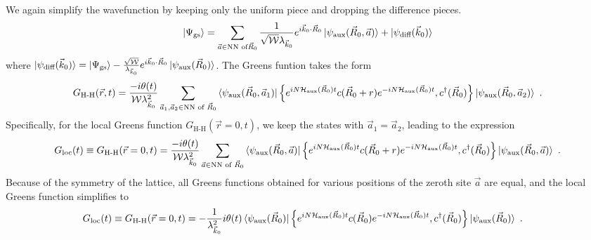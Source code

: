 \documentclass[prb]{revtex4-2}
\begin{document}
We again simplify the wavefunction by keeping only the uniform piece and dropping the difference pieces.
\begin{equation}\begin{aligned}
	\ket{\Psi_\text{gs}} = \sum_{\vec a \in \text{NN of}\vec R_0}\frac{1}{\sqrt \mathcal{W}\lambda_{\vec k_0}} e^{i\vec{k}_0\cdot\vec{R}_0} \ket{\psi_\text{aux}(\vec R_0, \vec a)} + \ket{\psi_\text{diff}(\vec k_0)}
\end{aligned}\end{equation}
where \(\ket{\psi_\text{diff}(\vec k_0)} = \ket{\Psi_\text{gs}} - \frac{\sqrt \mathcal{W}}{\lambda_{\vec k_0}} e^{i\vec{k}_0\cdot\vec{R}_0} \ket{\psi_\text{aux}(\vec R_0)}\). The Greens funtion takes the form
\begin{equation}\begin{aligned}
G_\text{H-H}(\vec r, t) =  \frac{-i\theta(t)}{\mathcal{W} \lambda_{\vec k_0}^2}\sum_{\vec a_1, \vec a_2 \in \text{NN of }\vec R_0}\braket{\psi_\text{aux}(\vec R_0, \vec a_1) | \left\{ e^{i N \mathcal{H}_\text{aux}(\vec R_0) t}c(\vec R_0 + r)e^{-i N \mathcal{H}_\text{aux}(\vec R_0) t}, c^\dagger(\vec R_0) \right\} | \psi_\text{aux}(\vec R_0, \vec a_2)}~.
\end{aligned}\end{equation}
Specifically, for the local Greens function \(G_\text{H-H}(\vec r=0, t)\), we keep the states with \(\vec a_1 = \vec a_2\), leading to the expression
\begin{equation}\begin{aligned}
	\label{greens_func_approx}
	G_\text{loc}(t) \equiv G_\text{H-H}(\vec r=0, t) =  \frac{-i\theta(t)}{\mathcal{W} \lambda_{\vec k_0}^2}\sum_{\vec a \in \text{NN of }\vec R_0}\braket{\psi_\text{aux}(\vec R_0, \vec a) | \left\{ e^{i N \mathcal{H}_\text{aux}(\vec R_0) t}c(\vec R_0 + r)e^{-i N \mathcal{H}_\text{aux}(\vec R_0) t}, c^\dagger(\vec R_0) \right\} | \psi_\text{aux}(\vec R_0, \vec a)}~.
\end{aligned}\end{equation}
Because of the symmetry of the lattice, all Greens functions obtained for various positions of the zeroth site \(\vec a\) are equal, and the local Greens function simplifies to
\begin{equation}\begin{aligned}
	G_\text{loc}(t) \equiv G_\text{H-H}(\vec r=0, t) &= -\frac{1}{\lambda_{\vec k_0}^2 }i\theta(t) \braket{\psi_\text{aux}(\vec R_0) | \left\{ e^{i N \mathcal{H}_\text{aux}(\vec R_0) t}c(\vec R_0)e^{-i N \mathcal{H}_\text{aux}(\vec R_0) t}, c^\dagger(\vec R_0) \right\} | \psi_\text{aux}(\vec R_0)}~.
\end{aligned}\end{equation}
\end{document}
